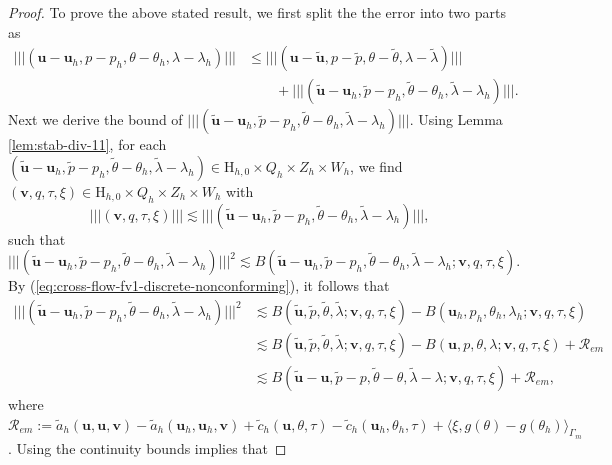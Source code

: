 \documentclass[onefignum,onetabnum,reqno,a4paper,final]{siamart250211}
\newcommand\bu{\boldsymbol{u}}
\newcommand\bv{\boldsymbol{v}}
\newcommand\0{\mathbf{0}}
\newcommand\bH{\boldsymbol{\mathrm{H}}}
\newcommand{\triplenorm}[1]{\lvert\!\lvert\!\lvert #1
  \rvert\!\rvert\!\rvert}
\numberwithin{figure}{section}
\numberwithin{table}{section}
\begin{document}
	\begin{proof}
	    To prove the above stated result, we first split the 
        the error into two parts as
        \begin{align}\label{eq:error-div-13}
         \triplenorm{(\bu-\bu_h,p-p_h,\theta-\theta_h,\lambda-\lambda_h)}
         &\le \triplenorm{(\bu-\tilde{\bu},p-\tilde{p},\theta-\tilde{\theta},\lambda-\tilde{\lambda})}
         \nonumber\\
&\qquad          +\triplenorm{(\tilde{\bu}-\bu_h,\tilde{p}-p_h,\tilde{\theta}-\theta_h,\tilde{\lambda}-\lambda_h)}.   
        \end{align}
        Next we derive the bound of 
      $  \triplenorm{(\tilde{\bu}-\bu_h,\tilde{p}-p_h,\tilde{\theta}-\theta_h,\tilde{\lambda}-\lambda_h)}$. Using Lemma \ref{lem:stab-div-11}, for each $(\tilde{\bu}-\bu_h,\tilde{p}-p_h,\tilde{\theta}-\theta_h,\tilde{\lambda}-\lambda_h)\in {\bH_{h,0}}\times Q_h\times Z_h\times W_h$, we find $(\bv,q,\tau,\xi)\in {\bH_{h,0}}\times Q_h\times Z_h\times W_h$ with  
      \[\triplenorm{(\bv,q,\tau,\xi)}\lesssim\triplenorm{(\tilde{\bu}-\bu_h,\tilde{p}-p_h,\tilde{\theta}-\theta_h,\tilde{\lambda}-\lambda_h)},\]
        such that
        $$
        \triplenorm{(\tilde{\bu}-\bu_h,\tilde{p}-p_h,\tilde{\theta}-\theta_h,\tilde{\lambda}-\lambda_h)}^2\lesssim B(\tilde{\bu}-\bu_h,\tilde{p}-p_h,\tilde{\theta}-\theta_h,\tilde{\lambda}-\lambda_h; \bv,q,\tau,\xi).
        $$
      By (\ref{eq:cross-flow-fv1-discrete-nonconforming}), it follows that 
      \begin{align}\label{eq:error-div-11}
       \triplenorm{(\tilde{\bu}-\bu_h,\tilde{p}-p_h,\tilde{\theta}-\theta_h,\tilde{\lambda}-\lambda_h)}^2&\lesssim B(\tilde{\bu},\tilde{p},\tilde{\theta},\tilde{\lambda}; \bv,q,\tau,\xi)-B(\bu_h,p_h,\theta_h,\lambda_h; \bv,q,\tau,\xi)\nonumber\\
       &\lesssim B(\tilde{\bu},\tilde{p},\tilde{\theta},\tilde{\lambda}; \bv,q,\tau,\xi)-B(\bu,p,\theta,\lambda; \bv,q,\tau,\xi)
        +\mathcal{R}_{em}\nonumber\\
       &\lesssim B(\tilde{\bu}-\bu,\tilde{p}-p,\tilde{\theta}-\theta,\tilde{\lambda}-\lambda; \bv,q,\tau,\xi)
        +\mathcal{R}_{em}, 
      \end{align}
      where
      $\mathcal{R}_{em}:=\widetilde{a}_h(\bu,\bu,\bv)-\widetilde{a}_h(\bu_h,\bu_h,\bv)+\widetilde{c}_h(\bu,\theta,\tau)-\widetilde{c}_h(\bu_h,\theta_h,\tau)+\langle \xi, g(\theta)-g(\theta_h)\rangle_{\Gamma_m}$.
      Using the continuity bounds implies that

\end{proof}
\end{document}
